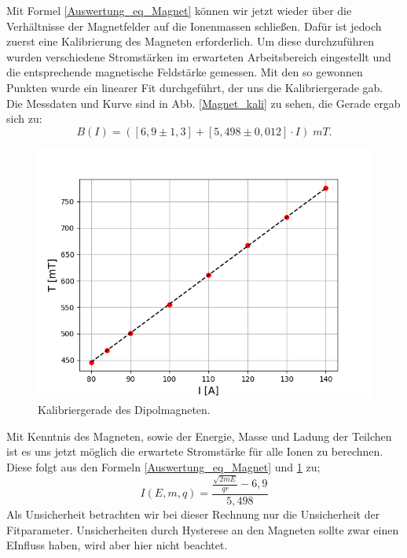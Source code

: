 Mit Formel \ref{Auswertung_eq_Magnet} können wir jetzt wieder über die Verhältnisse der Magnetfelder auf die Ionenmassen schließen.
Dafür ist jedoch zuerst eine Kalibrierung des Magneten erforderlich.
Um diese durchzuführen wurden verschiedene Stromstärken im erwarteten Arbeitsbereich eingestellt und die entsprechende magnetische Feldstärke gemessen.
Mit den so gewonnen Punkten wurde ein linearer Fit durchgeführt, der uns die Kalibriergerade gab.
Die Messdaten und Kurve sind in Abb. \ref{Magnet_kali} zu sehen, die Gerade ergab sich zu:
\begin{equation}
B(I) = ( [6,9 \pm 1,3] + [5,498 \pm 0,012] \cdot I ) \; mT.
\label{kali}
\end{equation}

\begin{figure}[ht]
  \centering
  \includegraphics[width=0.7\linewidth]{Pictures/magnet.png}
  \caption{Kalibriergerade des Dipolmagneten.}
  \label{kali}
\end{figure}

Mit Kenntnis des Magneten, sowie der Energie, Masse und Ladung der Teilchen ist es uns jetzt möglich die erwartete Stromstärke für alle Ionen zu berechnen.
Diese folgt aus den Formeln \ref{Auswertung_eq_Magnet} und \ref{kali} zu;
\begin{equation}
I(E, m, q) = \frac{\frac{{\sqrt{2mE}}}{qr}-6,9}{5,498}
\label{HE_ion}
\end{equation}
Als Unsicherheit betrachten wir bei dieser Rechnung nur die Unsicherheit der Fitparameter.
Unsicherheiten durch Hysterese an den Magneten sollte zwar einen EInfluss haben, wird aber hier nicht beachtet.

